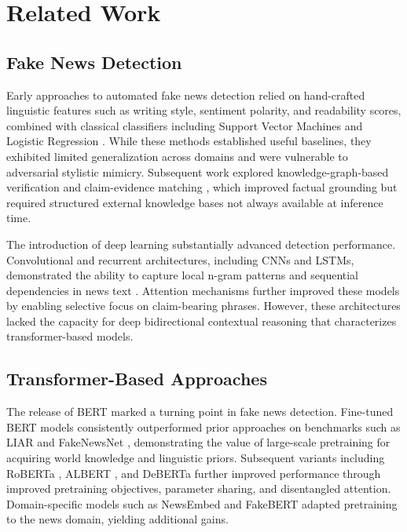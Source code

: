 \documentclass[conference]{IEEEtran}
\begin{document}
\section{Related Work}
\label{sec:related}

\subsection{Fake News Detection}

Early approaches to automated fake news detection relied on hand-crafted linguistic features such as writing style, sentiment polarity, and readability scores, combined with classical classifiers including Support Vector Machines and Logistic Regression \cite{castillo2011credibility, potthast2018stylometric}. While these methods established useful baselines, they exhibited limited generalization across domains and were vulnerable to adversarial stylistic mimicry. Subsequent work explored knowledge-graph-based verification \cite{popat2018declare} and claim-evidence matching \cite{thorne2018fever}, which improved factual grounding but required structured external knowledge bases not always available at inference time.

The introduction of deep learning substantially advanced detection performance. Convolutional and recurrent architectures, including CNNs and LSTMs, demonstrated the ability to capture local n-gram patterns and sequential dependencies in news text \cite{wang2018eann, ma2016detecting}. Attention mechanisms further improved these models by enabling selective focus on claim-bearing phrases. However, these architectures lacked the capacity for deep bidirectional contextual reasoning that characterizes transformer-based models.

\subsection{Transformer-Based Approaches}

The release of BERT \cite{devlin2019bert} marked a turning point in fake news detection. Fine-tuned BERT models consistently outperformed prior approaches on benchmarks such as LIAR \cite{wang2017liar} and FakeNewsNet \cite{shu2020fakenewsnet}, demonstrating the value of large-scale pretraining for acquiring world knowledge and linguistic priors. Subsequent variants including RoBERTa \cite{liu2019roberta}, ALBERT \cite{lan2019albert}, and DeBERTa \cite{he2021deberta} further improved performance through improved pretraining objectives, parameter sharing, and disentangled attention. Domain-specific models such as NewsEmbed \cite{hamborg2019newsembed} and FakeBERT \cite{kaliyar2021fakebert} adapted pretraining to the news domain, yielding additional gains.
\end{document}
